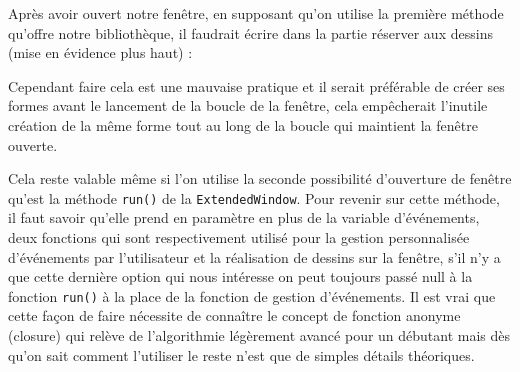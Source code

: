 \documentclass[11pt,a4paper,krantz2,11pt,oneside]{krantz}
\newenvironment{Shaded}{\begin{snugshade}}{\end{snugshade}}
\newcommand{\DecValTok}[1]{\textcolor[rgb]{0.06,0.06,0.06}{#1}}
\newcommand{\KeywordTok}[1]{\textcolor[rgb]{0.27,0.27,0.27}{\textbf{#1}}}
\newcommand{\NormalTok}[1]{#1}
\newcommand{\OtherTok}[1]{\textcolor[rgb]{0.37,0.37,0.37}{#1}}
\newcommand{\StringTok}[1]{\textcolor[rgb]{0.5,0.5,0.5}{#1}}
\begin{document}
Après avoir ouvert notre fenêtre, en supposant qu'on utilise la première méthode qu'offre notre bibliothèque, il faudrait écrire dans la partie réserver aux dessins (mise en évidence plus haut) :

\begin{Shaded}
\end{Shaded}

Cependant faire cela est une mauvaise pratique et il serait préférable de créer ses formes avant le lancement de la boucle de la fenêtre, cela empêcherait l'inutile création de la même forme tout au long de la boucle qui maintient la fenêtre ouverte.

Cela reste valable même si l'on utilise la seconde possibilité d'ouverture de fenêtre qu'est la méthode \texttt{run()} de la \texttt{ExtendedWindow}. Pour revenir sur cette méthode, il faut savoir qu'elle prend en paramètre en plus de la variable d'événements, deux fonctions qui sont respectivement utilisé pour la gestion personnalisée d'événements par l'utilisateur et la réalisation de dessins sur la fenêtre, s'il n'y a que cette dernière option qui nous intéresse on peut toujours passé null à la fonction \texttt{run()} à la place de la fonction de gestion d'événements. Il est vrai que cette façon de faire nécessite de connaître le concept de fonction anonyme (closure) qui relève de l'algorithmie légèrement avancé pour un débutant mais dès qu'on sait comment l'utiliser le reste n'est que de simples détails théoriques.

\begin{Shaded}
\end{Shaded}
\end{document}
